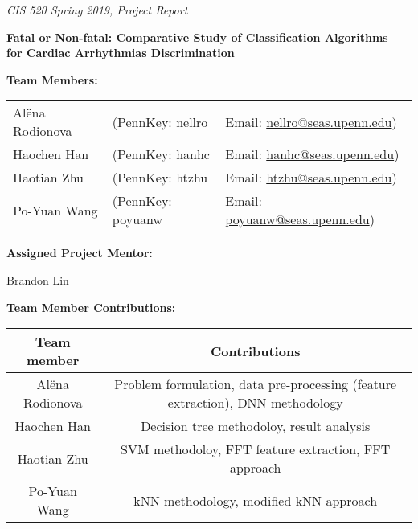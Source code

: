 \documentclass[twoside,11pt]{article}
\renewcommand{\>}{{\rightarrow}}
\newcommand{\1}{{\mathbf 1}}
\newcommand{\0}{{\mathbf 0}}
\begin{document}

\emph{\footnotesize{CIS 520 Spring 2019, Project Report}}


\vspace{12pt}

\textbf{\Large{Fatal or Non-fatal: Comparative Study of 
		Classification Algorithms \\for Cardiac Arrhythmias 
		Discrimination}}

\vspace{1cm}

\textbf{Team Members:}

\begin{tabular}{lll}%
	Al\"{e}na Rodionova & 
	(PennKey: nellro &
	Email: 
	\href{mailto:nellro@seas.upenn.edu}{nellro@seas.upenn.edu}) \\
	Haochen Han & 
	(PennKey: hanhc& 
	Email: \href{mailto:hanhc@seas.upenn.edu}{hanhc@seas.upenn.edu})\\
	Haotian Zhu &
	(PennKey: htzhu& 
	Email: \href{mailto:htzhu@seas.upenn.edu}{htzhu@seas.upenn.edu})\\
	Po-Yuan Wang & 
	(PennKey: poyuanw & 
	Email:
	\href{mailto:poyuanw@seas.upenn.edu}{poyuanw@seas.upenn.edu})
\end{tabular}


\vspace{2cm}


\textbf{Assigned Project Mentor:}

Brandon Lin

\vspace{1cm}

\textbf{Team Member Contributions:}

\begin{center}
	\begin{tabular}{|c|c|}
		\hline
		\textbf{Team member} & \textbf{Contributions} \\ \hline
		Al\"{e}na Rodionova&   Problem formulation, data 
		pre-processing (feature extraction), DNN methodology\\ 
		\hline
		Haochen Han&    Decision tree methodoloy, result analysis \\ 
		\hline
		Haotian Zhu&    SVM methodoloy, FFT feature extraction, FFT 
		approach  \\ \hline
		Po-Yuan Wang&  kNN methodology, modified kNN approach  \\ 
		\hline
	\end{tabular}
\end{center}
\end{document}
